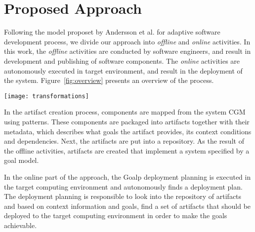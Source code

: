 \section{Proposed Approach}
\label{sec:proposal}



Following the model proposet by Andersson et al.\cite{andersson_software_2013} for adaptive software development process, we divide our approach into \emph{offline} and \emph{online} activities. In this work, the \emph{offline} activities are conducted by software engineers, and result in development and publishing of software components. The \emph{online} activities are autonomously executed in target environment, and result in the deployment of the system. Figure~\ref{fig:overview} presents an overview of the process.

\begin{figure*}[!htb]
  \centering
  \texttt{[image: transformations]}
  \caption{Activities: (1) component mapping; (2) packaging; (3) deployment planning; (4) component binding}
\label{fig:overview}
\end{figure*}


In the artifact creation process, components are mapped from the system CGM using patterns. These components are packaged into artifacts together with their metadata, which describes what goals the artifact provides, its context conditions and dependencies. Next, the artifacts are put into a repository. As the result of the offline activities, artifacts are created that implement a system specified by a goal model.

In the online part of the approach, the Goalp deployment planning is executed in the target computing environment and autonomously finds a deployment plan.
The deployment planning is responsible to look into the repository of artifacts and based on context information and goals, find a set of artifacts that should be deployed to the target computing environment in order to make the goals achievable.

